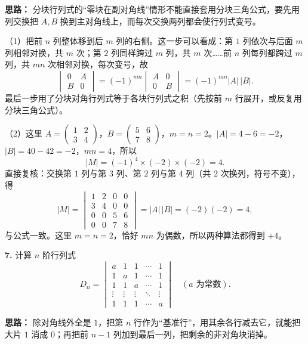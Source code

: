 \ifshowsolutions%
\textbf{思路：} 分块行列式的“零块在副对角线”情形不能直接套用分块三角公式，要先用列交换把 $A,B$ 换到主对角线上，而每次交换两列都会使行列式变号。

（1）把前 $n$ 列整体移到后 $m$ 列的右侧。这一步可以看成：第 $1$ 列依次与后面 $m$ 列相邻对换，共 $m$ 次；第 $2$ 列同样跨过 $m$ 列，共 $m$ 次……前 $n$ 列每列都跨过 $m$ 列，共 $mn$ 次相邻对换，每次变号，故
\[
\begin{vmatrix}0&A\\B&0\end{vmatrix}=(-1)^{mn}\begin{vmatrix}A&0\\0&B\end{vmatrix}=(-1)^{mn}|A|\,|B|.
\]
最后一步用了分块对角行列式等于各块行列式之积（先按前 $m$ 行展开，或反复用分块三角公式）。

（2）这里 $A=\begin{pmatrix}1&2\\3&4\end{pmatrix}$，$B=\begin{pmatrix}5&6\\7&8\end{pmatrix}$，$m=n=2$。$|A|=4-6=-2$，$|B|=40-42=-2$，$mn=4$，所以
\[
|M|=(-1)^{4}\times(-2)\times(-2)=4.
\]
直接复核：交换第 $1$ 列与第 $3$ 列、第 $2$ 列与第 $4$ 列（共 $2$ 次换列，符号不变），得
\[
|M|=\begin{vmatrix}1&2&0&0\\3&4&0&0\\0&0&5&6\\0&0&7&8\end{vmatrix}
=|A|\,|B|=(-2)(-2)=4,
\]
与公式一致。这里 $m=n=2$，恰好 $mn$ 为偶数，所以两种算法都得到 $+4$。


\else \answerarea[8] \fi%

\textbf{7.} 计算 $n$ 阶行列式
\[
D_n=\begin{vmatrix}
a&1&1&\cdots&1\\
1&a&1&\cdots&1\\
1&1&a&\cdots&1\\
\vdots&\vdots&\vdots&\ddots&\vdots\\
1&1&1&\cdots&a
\end{vmatrix}\quad (a\text{ 为常数}).
\]

\ifshowsolutions%
\textbf{思路：} 除对角线外全是 $1$，把第 $n$ 行作为“基准行”，用其余各行减去它，就能把大片 $1$ 消成 $0$；再把前 $n-1$ 列加到最后一列，把剩余的非对角块消掉。

